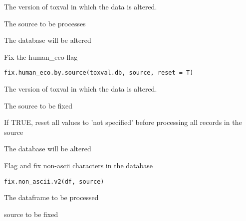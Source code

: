 \documentclass[letterpaper]{book}
\begin{document}
%
\begin{Arguments}
\begin{ldescription}
\item[\code{toxval.db}] The version of toxval in which the data is altered.

\item[\code{source}] The source to be processes
\end{ldescription}
\end{Arguments}
%
\begin{Value}
The database will be altered
\end{Value}
%
\begin{Description}\relax
Fix the human\_eco flag
\end{Description}
%
\begin{Usage}
\begin{verbatim}
fix.human_eco.by.source(toxval.db, source, reset = T)
\end{verbatim}
\end{Usage}
%
\begin{Arguments}
\begin{ldescription}
\item[\code{toxval.db}] The version of toxval in which the data is altered.

\item[\code{source}] The source to be fixed

\item[\code{reset}] If TRUE, reset all values to 'not specified' before processing all records in the source
\end{ldescription}
\end{Arguments}
%
\begin{Value}
The database will be altered
\end{Value}
%
\begin{Description}\relax
Flag and fix non-ascii characters in the database
\end{Description}
%
\begin{Usage}
\begin{verbatim}
fix.non_ascii.v2(df, source)
\end{verbatim}
\end{Usage}
%
\begin{Arguments}
\begin{ldescription}
\item[\code{df}] The dataframe to be processed

\item[\code{The}] source to be fixed
\end{ldescription}
\end{Arguments}
\end{document}
